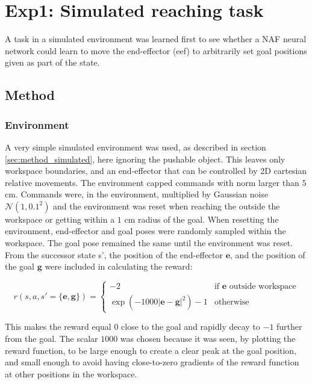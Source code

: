 \chapter{Exp1: Simulated reaching task}

A task in a simulated environment was learned first to see whether a NAF neural
network could learn to move the end-effector (eef) to arbitrarily set goal
positions given as part of the state.

\section{Method}

\subsection{Environment}

A very simple simulated environment was used, as described in section
\ref{sec:method_simulated}, here ignoring the pushable object. This leaves only
workspace boundaries, and an end-effector that can be controlled by 2D
cartesian relative movements. The environment capped commands with norm larger
than $5$ cm. Commands were, in the environment, multiplied by Gaussian noise
$\mathcal{N}(1, 0.1^2)$ and the environment was reset when reaching the outside
the workspace or getting within a $1$ cm radius of the goal. When resetting the
environment, end-effector and goal poses were randomly sampled within the
workspace. The goal pose remained the same until the environment was reset.
From the successor state s', the position of the end-effector $\mathbf{e}$, and
the position of the goal $\mathbf{g}$ were included in calculating the
reward:

\begin{equation}
    r(s, a, s'=\lbrace \mathbf{e, g} \rbrace) =
    \begin{cases}
        -2 &\text{if } \mathbf{e} \text{ outside workspace}\\
        \exp\left(-1000|\mathbf{e} - \mathbf{g}|^2\right) - 1 &\text{otherwise}
    \end{cases}
\end{equation}

This makes the reward equal $0$ close to the goal and rapidly decay to $-1$
further from the goal. The scalar $1000$ was chosen because it was seen, by
plotting the reward function, to be large enough to create a clear peak at the
goal position, and small enough to avoid having close-to-zero gradients of the
reward function at other positions in the workspace.

